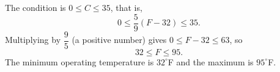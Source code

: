 The condition is $0\le C\le35$, that is,
\[
0\le\dfrac{5}{9}(F-32)\le35 .
\]
Multiplying by $\dfrac{9}{5}$ (a positive number) gives $0\le F-32\le63$, so
\[
\boxed{32\le F\le95}.
\]
The minimum operating temperature is $32^\circ$F and the maximum is $95^\circ$F.
